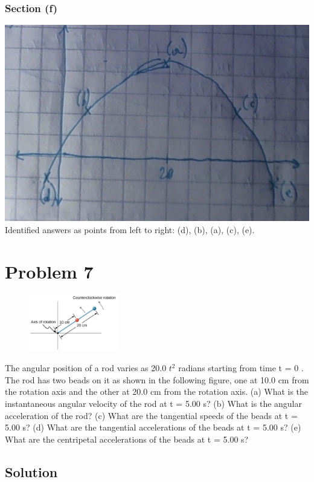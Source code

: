 \documentclass[12pt]{article}
\begin{document}
\subsubsection*{Section (f)}
\includegraphics[width=\textwidth]{graph_6.jpg} 
Identified answers as points from left to right: (d), (b), (a), (c), (e).


\pagebreak
\section*{Problem 7}
\begin{figure}
    \vspace{-30pt}
    \includegraphics[width=0.35\textwidth]{graph_7.png} 
\end{figure}
The angular position of a rod varies as 20.0 $t^2$ radians starting from time t = 0 . The rod has
two beads on it as shown in the following figure, one at 10.0 cm from the rotation axis and the
other at 20.0 cm from the rotation axis. (a) What is the instantaneous angular velocity of the rod
at t = 5.00 s? (b) What is the angular acceleration of the rod? (c) What are the tangential speeds
of the beads at t = 5.00 s? (d) What are the tangential accelerations of the beads at t = 5.00 s? (e)
What are the centripetal accelerations of the beads at t = 5.00 s?

\subsection*{Solution}
\end{document}
